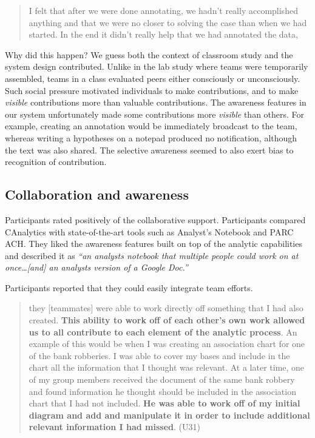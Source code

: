 \begin{quote}
	I felt that after we were done annotating, we hadn't really accomplished
	anything and that we were no closer to solving the case than when we had
	started. In the end it didn't really help that we had annotated the
	data,
\end{quote}

Why did this happen? We guess both the context of classroom study and
the system design contributed. Unlike in the lab study where teams were
temporarily assembled, teams in a class evaluated peers either
consciously or unconsciously. Such social pressure motivated individuals
to make contributions, and to make \emph{visible} contributions more
than valuable contributions. The awareness features in our system
unfortunately made some contributions more \emph{visible} than others.
For example, creating an annotation would be immediately broadcast to
the team, whereas writing a hypotheses on a notepad produced no
notification, although the text was also shared. The selective awareness
seemed to also exert bias to recognition of contribution.

\subsection{Collaboration and
	awareness}\label{collaboration-and-awareness}

Participants rated positively of the collaborative support. Participants
compared CAnalytics with state-of-the-art tools such as Analyst's
Notebook and PARC ACH. They liked the awareness features built on top of
the analytic capabilities and described it as \emph{``an analysts
	notebook that multiple people could work on at once\ldots{}{[}and{]} an
	analysts version of a Google Doc.''}

Participants reported that they could easily integrate team efforts.

\begin{quote}
	they {[}teammates{]} were able to work directly off something that I had
	also created. \textbf{This ability to work off of each other's own work
		allowed us to all contribute to each element of the analytic process}.
	An example of this would be when I was creating an association chart for
	one of the bank robberies. I was able to cover my bases and include in
	the chart all the information that I thought was relevant. At a later
	time, one of my group members received the document of the same bank
	robbery and found information he thought should be included in the
	association chart that I had not included. \textbf{He was able to work
		off of my initial diagram and add and manipulate it in order to include
		additional relevant information I had missed}. (U31)
\end{quote}

